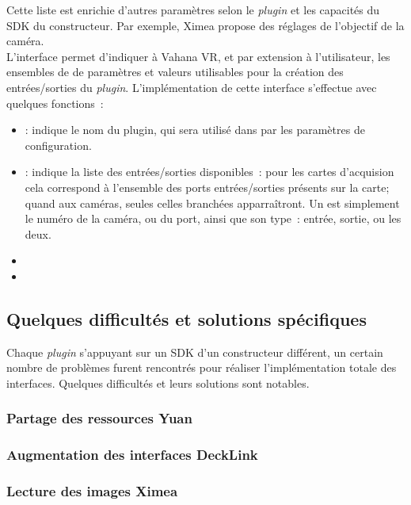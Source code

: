 Cette liste est enrichie d'autres paramètres selon le \textit{plugin} et 
les capacités du SDK du constructeur. Par exemple, Ximea propose des réglages
de l'objectif de la caméra.\\
\newline
L'interface  permet d'indiquer à Vahana VR, et par extension
à l'utilisateur, les ensembles de de paramètres et valeurs utilisables pour la
création des entrées/sorties du \textit{plugin}. 
L'implémentation de cette interface s'effectue avec quelques fonctions~:
\begin{itemize}
  \item {} : indique le nom du plugin, qui sera utilisé
  dans par les paramètres de configuration.
  \item {} : indique la liste des entrées/sorties
  disponibles~: pour les cartes d'acquision cela correspond à l'ensemble des ports
  entrées/sorties présents sur la carte; quand aux caméras, seules celles branchées apparraîtront. 
  Un  est simplement le numéro de la caméra, ou du port, ainsi
  que son type~: entrée, sortie, ou les deux.
  \item {}
  \item {}
\end{itemize}

\subsection{Quelques difficultés et solutions spécifiques}
Chaque \textit{plugin} s'appuyant sur un SDK d'un constructeur différent, un certain nombre
de problèmes furent rencontrés pour réaliser l'implémentation totale des interfaces.
Quelques difficultés et leurs solutions sont notables.

\subsubsection{Partage des ressources Yuan}

\subsubsection{Augmentation des interfaces DeckLink}

\subsubsection{Lecture des images Ximea}


